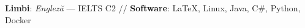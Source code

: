 
\smallskip
{}%
\textbf{Limbi}: \emph{Engleză} --- IELTS C2 //
\textbf{Software}: \LaTeX, Linux, Java, C\#, Python, Docker
